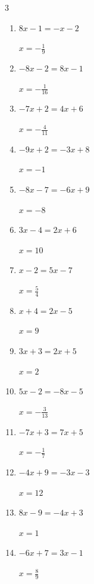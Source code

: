 \begin{multicols}{3}
\begin{enumerate}
        $\displaystyle x=-\frac{3}{8}$

  \item $8x-1=-x-2$

        $\displaystyle x=-\frac{1}{9}$

  \item $-8x-2=8x-1$

        $\displaystyle x=-\frac{1}{16}$

  \item $-7x+2=4x+6$

        $\displaystyle x=-\frac{4}{11}$

  \item $-9x+2=-3x+8$

        $\displaystyle x=-1$

  \item $-8x-7=-6x+9$

        $\displaystyle x=-8$

  \item $3x-4=2x+6$

        $\displaystyle x=10$

  \item $x-2=5x-7$

        $\displaystyle x=\frac{5}{4}$

\columnbreak %

\resetques

  \item $x+4=2x-5$

        $\displaystyle x=9$

  \item $3x+3=2x+5$

        $\displaystyle x=2$

  \item $5x-2=-8x-5$

        $\displaystyle x=-\frac{3}{13}$

  \item $-7x+3=7x+5$

        $\displaystyle x=-\frac{1}{7}$

  \item $-4x+9=-3x-3$

        $\displaystyle x=12$

  \item $8x-9=-4x+3$

        $\displaystyle x=1$

  \item $-6x+7=3x-1$

        $\displaystyle x=\frac{8}{9}$


\end{enumerate}
\end{multicols}
